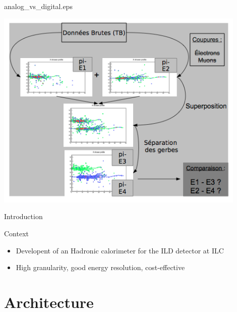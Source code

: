 \documentclass[10pt]{beamer}
\begin{document}
\begin{frame}{analog\_vs\_digital.eps}
    \centerline{\includegraphics[width=0.9\textwidth]{images/Beam2012Arbor}}
\end{frame}

\begin{frame}{Introduction}
\pause 
\begin{block}{ Context}
  \begin{itemize}
  \item Developent of an Hadronic calorimeter for the ILD detector at ILC
  \item High granularity, good energy resolution, cost-effective
  \end{itemize}
\end{block}

\end{frame}

\section{Architecture}
\end{document}
